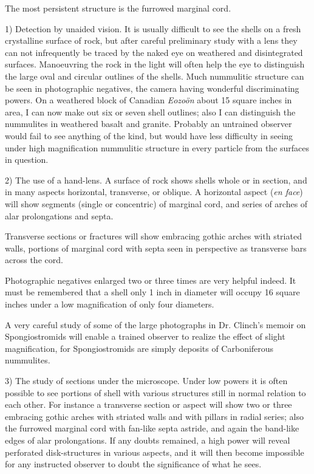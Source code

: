 \documentclass[a4paper, 12pt, oneside]{article}
\begin{document}
The most persistent structure is the furrowed marginal cord.

1) Detection by unaided vision. It is usually difficult to see the shells on a fresh crystalline surface of rock, but after careful preliminary study with a lens they can not infrequently be traced by the naked eye on weathered and disintegrated surfaces. Manoeuvring the rock in the light will often help the eye to distinguish the large oval and circular outlines of the shells. Much nummulitic structure can be seen in photographic negatives, the camera having wonderful discriminating powers. On a weathered block of Canadian \emph{Eozoön} about 15 square inches in area, I can now make out six or seven shell outlines; also I can distinguish the nummulites in weathered basalt and granite. Probably an untrained observer would fail to see anything of the kind, but would have less difficulty in seeing under high magnification nummulitic structure in every particle from the surfaces in question.

2) The use of a hand-lens. A surface of rock shows shells whole or in section, and in many aspects horizontal, transverse, or oblique. A horizontal aspect (\emph{en face}) will show segments (single or concentric) of marginal cord, and series of arches of alar prolongations and septa.

Transverse sections or fractures will show embracing gothic arches with striated walls, portions of marginal cord with septa seen in perspective as transverse bars across the cord.

Photographic negatives enlarged two or three times are very helpful indeed. It must be remembered that a shell only 1 inch in diameter will occupy 16 square inches under a low magnification of only four diameters.

A very careful study of some of the large photographs in Dr. Clinch's memoir on Spongiostromids will enable a trained observer to realize the effect of slight magnification, for Spongiostromids are simply deposits of Carboniferous nummulites.

3) The study of sections under the microscope. Under low powers it is often possible to see portions of shell with various structures still in normal relation to each other. For instance a transverse section or aspect will show two or three embracing gothic arches with striated walls and with pillars in radial series; also the furrowed marginal cord with fan-like septa astride, and again the band-like edges of alar prolongations. If any doubts remained, a high power will reveal perforated disk-structures in various aspects, and it will then become impossible for any instructed observer to doubt the significance of what he sees.
\end{document}
